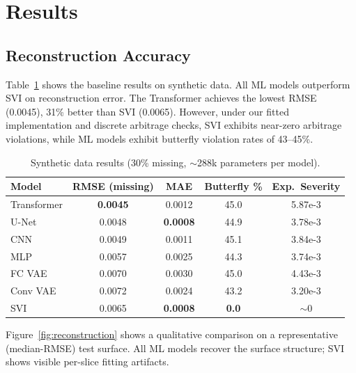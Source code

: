 \documentclass[11pt, a4paper]{article}
\begin{document}

\section{Results}

\subsection{Reconstruction Accuracy}

Table~\ref{tab:synthetic} shows the baseline results on synthetic data. All ML models outperform SVI on reconstruction error. The Transformer achieves the lowest RMSE (0.0045), 31\% better than SVI (0.0065). However, under our fitted implementation and discrete arbitrage checks, SVI exhibits near-zero arbitrage violations, while ML models exhibit butterfly violation rates of 43--45\%.

\begin{table}[H]
    \centering
    \caption{Synthetic data results (30\% missing, ${\sim}$288k parameters per model).}
    \label{tab:synthetic}
    \begin{tabular}{lcccc}
        \toprule
        Model & RMSE (missing) & MAE & Butterfly \% & Exp.\ Severity \\
        \midrule
        Transformer & \textbf{0.0045} & 0.0012 & 45.0 & 5.87e-3 \\
        U-Net       & 0.0048 & \textbf{0.0008} & 44.9 & 3.78e-3 \\
        CNN         & 0.0049 & 0.0011 & 45.1 & 3.84e-3 \\
        MLP         & 0.0057 & 0.0025 & 44.3 & 3.74e-3 \\
        FC VAE      & 0.0070 & 0.0030 & 45.0 & 4.43e-3 \\
        Conv VAE    & 0.0072 & 0.0024 & 43.2 & 3.20e-3 \\
        \midrule
        SVI         & 0.0065 & \textbf{0.0008} & \textbf{0.0} & $\sim$0 \\
        \bottomrule
    \end{tabular}
\end{table}

Figure~\ref{fig:reconstruction} shows a qualitative comparison on a representative (median-RMSE) test surface. All ML models recover the surface structure; SVI shows visible per-slice fitting artifacts.
\end{document}

